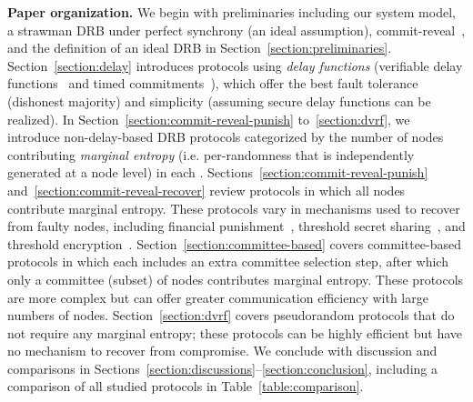 \textbf{Paper organization.} We begin with preliminaries including our system model, a strawman DRB under perfect synchrony (an ideal assumption), commit-reveal~\cite{blum1983coin}, and the definition of an ideal DRB in Section~\ref{section:preliminaries}. Section~\ref{section:delay} introduces protocols using \textit{delay functions} (verifiable delay functions~\cite{boneh2018verifiable} and timed commitments~\cite{boneh2000timed}), which offer the best fault tolerance (dishonest majority) and simplicity (assuming secure delay functions can be realized). In Section~\ref{section:commit-reveal-punish} to~\ref{section:dvrf}, we introduce non-delay-based DRB protocols categorized by the number of nodes contributing \textit{marginal entropy} (i.e. per-\epoch randomness that is independently generated at a node level) in each \epoch. Sections~\ref{section:commit-reveal-punish} and~\ref{section:commit-reveal-recover} review protocols in which all nodes contribute marginal entropy. These protocols vary in mechanisms used to recover from faulty nodes, including financial punishment~\cite{youcai2017randao, david2020economically}, threshold secret sharing~\cite{schoenmakers1999simple, cascudo2017scrape}, and threshold encryption~\cite{desmedt1990Threshold}. Section~\ref{section:committee-based} covers committee-based protocols in which each \epoch includes an extra committee selection step, after which only a committee (subset) of nodes contributes marginal entropy. These protocols are more complex but can offer greater communication efficiency with large numbers of nodes. Section~\ref{section:dvrf} covers pseudorandom protocols that do not require any marginal entropy; these protocols can be highly efficient but have no mechanism to recover from compromise. We conclude with discussion and comparisons in Sections~\ref{section:discussions}--\ref{section:conclusion}, including a comparison of all studied protocols in Table~\ref{table:comparison}.

